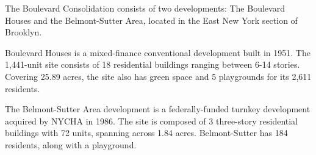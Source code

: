 The Boulevard Consolidation consists of two developments: The Boulevard Houses and the Belmont-Sutter Area, located in the East New York section of Brooklyn. \par \vspace{.7\baselineskip}Boulevard Houses is a mixed-finance conventional development built in 1951. The 1,441-unit site consists of 18 residential buildings ranging between 6-14 stories. Covering 25.89 acres, the site also has green space and 5 playgrounds for its 2,611 residents. \par \vspace{.7\baselineskip}The Belmont-Sutter Area development is a federally-funded turnkey development acquired by NYCHA in 1986. The site is composed of 3 three-story residential buildings with 72 units, spanning across 1.84 acres. Belmont-Sutter has 184 residents, along with a playground.